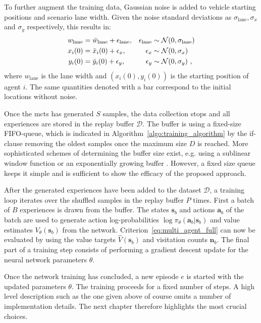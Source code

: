 To further augment the training data, Gaussian noise is added to vehicle starting positions and scenario lane width. Given the noise standard deviations as $\sigma_{\text{lane}}, \sigma_{x}$ and $\sigma_{y}$ respectively, this results in:
\begin{align}
    w_{\text{lane}} & = \bar w_{\text{lane}} +  \epsilon_{\text{lane}}, & \epsilon_{\text{lane}}  &\sim \mathcal{N}(0, \sigma_{\text{lane}})\\
    x_i (0) & = \bar x_i (0) + \epsilon_x, & \epsilon_x & \sim \mathcal{N}(0, \sigma_{x}) \\
    y_i (0) & = \bar y_i (0) + \epsilon_y, & \epsilon_y & \sim \mathcal{N}(0, \sigma_{y})~,
\end{align}
where $w_{\text{lane}}$ is the lane width and $(x_i (0), y_i (0) )$ is the starting position of agent $i$. The same quantities denoted with a bar correspond to the initial locations without noise.

Once the \gls{mcts} has generated $S$ samples, the data collection stops and all experiences are stored in the replay buffer $\mathcal D$. The buffer is using a fixed-size FIFO-queue, which is indicated in Algorithm~\ref{algo:training_algorithm} by the if-clause removing the oldest samples once the maximum size $D$ is reached. More sophisticated schemes of determining the buffer size exist, e.g. using a sublinear window function \cite{wuAcceleratingSelfPlayLearning2020} or an exponentially growing buffer \cite{anthonyThinkingFastSlow2017}. However, a fixed size queue keeps it simple and is sufficient to show the efficacy of the proposed approach.

After the generated experiences have been added to the dataset $\mathcal D$, a training loop iterates over the shuffled samples in the replay buffer $P$ times. First a batch of $B$ experiences is drawn from the buffer. The states $\mathbf s_b$ and actions $\mathbf a_b$ of the batch are used to generate action log-probabilities $\log \pi_\theta (\mathbf a_b | \mathbf s_b)$ and value estimates $V_\theta (\mathbf s_b)$ from the network. Criterion~\ref{eq:multi_agent_full} can now be evaluated by using the value targets $\hat V (\mathbf s_b)$ and visitation counts $\mathbf n_b$. The final part of a training step consists of performing a gradient descent update for the neural network parameters $\theta$.

Once the network training has concluded, a new episode $e$ is started with the updated parameters $\theta$. The training proceeds for a fixed number of steps. A high level description such as the one given above of course omits a number of implementation details. The next chapter therefore highlights the most crucial choices.





